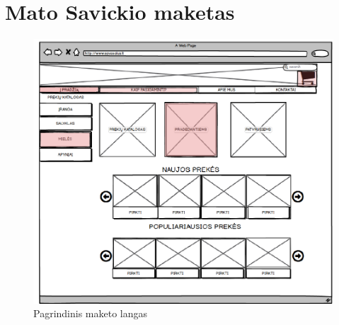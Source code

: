 \documentclass[oneside]{VUMIFPSkursinis}
\begin{document}
\section{Mato Savickio maketas}
	\begin{figure}
  		\includegraphics[width=\linewidth]{mak1.png}
  		\caption{Pagrindinis maketo langas}
 		 \label{fig:mak1}
	\end{figure}
\end{document}
